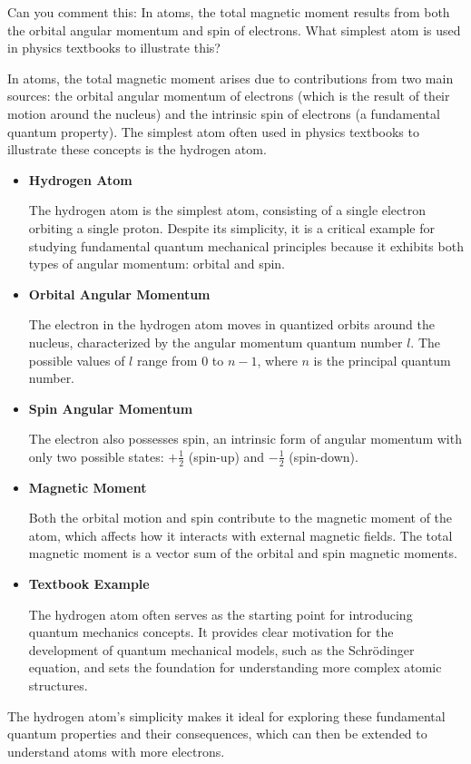 \begin{ai}
Can you comment this: In atoms, the total magnetic moment results from both the orbital angular
momentum and spin of electrons. What simplest atom is used in physics textbooks to illustrate this?
\end{ai}

\begin{airesult}
In atoms, the total magnetic moment arises due to contributions from two main sources: the orbital
angular momentum of electrons (which is the result of their motion around the nucleus) and the
intrinsic spin of electrons (a fundamental quantum property). The simplest atom often used in
physics textbooks to illustrate these concepts is the hydrogen atom.

\vsp

\begin{itemize}
\item \textbf{Hydrogen Atom}

  The hydrogen atom is the simplest atom, consisting of a single electron orbiting a single proton.
Despite its simplicity, it is a critical example for studying fundamental quantum mechanical
principles because it exhibits both types of angular momentum: orbital and spin.

\item \textbf{Orbital Angular Momentum}

  The electron in the hydrogen atom moves in quantized orbits around the nucleus, characterized by
the angular momentum quantum number \( l \). The possible values of \( l \) range from 0 to \( n-1
\), where \( n \) is the principal quantum number.

\item \textbf{Spin Angular Momentum}

  The electron also possesses spin, an intrinsic form of angular momentum with only two possible
states: \(+\frac{1}{2}\) (spin-up) and \(-\frac{1}{2}\) (spin-down).

\item \textbf{Magnetic Moment}

  Both the orbital motion and spin contribute to the magnetic moment of the atom, which affects how
it interacts with external magnetic fields. The total magnetic moment is a vector sum of the orbital
and spin magnetic moments.

\item \textbf{Textbook Example}

  The hydrogen atom often serves as the starting point for introducing quantum mechanics concepts.
It provides clear motivation for the development of quantum mechanical models, such as the
Schrödinger equation, and sets the foundation for understanding more complex atomic structures.
\end{itemize}

\vsp

The hydrogen atom's simplicity makes it ideal for exploring these fundamental quantum properties and
their consequences, which can then be extended to understand atoms with more electrons.
\end{airesult}



